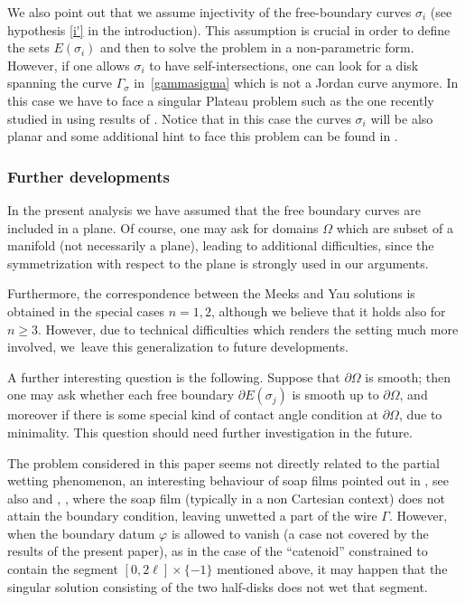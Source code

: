 \documentclass[11pt]{article}
\numberwithin{equation}{section}
\let\Om\Omega
\theoremstyle{definition}
\begin{document}
We also point out that we assume injectivity of the free-boundary
curves $\sigma_i$ (see hypothesis \ref{i'} in the introduction).
This assumption is crucial in order to define the sets
$E(\sigma_i)$ and then to solve the problem in a non-parametric form.
However, if one allows $\sigma_i$ to have self-intersections,
one can look for a disk spanning the curve $\Gamma_\sigma$
in~\eqref{gammasigma} which is not a Jordan curve anymore.
In this case we have to face a singular Plateau problem such as the one
recently studied in \cite{Creutz}
using results of \cite{LW}. Notice that in this case the curves $\sigma_i$ will be also planar and some additional hint to face this problem can be found in \cite{CS}.

\subsubsection*{Further developments} In the present analysis we have assumed that the free boundary curves are included in a plane. Of course, one may ask for domains $\Omega$ which are subset of a manifold (not necessarily a plane), leading to additional difficulties,
since the symmetrization with respect to the plane is strongly used in our arguments.

Furthermore, the correspondence between the Meeks and Yau
solutions is obtained in the special cases $n=1,2$,
although we believe that it holds also for $n\geq3$. However, due to technical difficulties which renders the setting much more involved, we~leave this generalization to future developments.

A further interesting question
is the following. Suppose that
$\partial \Om$ is smooth; then one may ask whether each free
boundary $\partial E(\sigma_j)$
is smooth up to $\partial \Om$, and moreover if there is some special
kind of contact angle condition at $\partial \Om$, due to minimality.
This question should need further investigation in the future.

The problem
considered in this paper seems not directly related to the
partial wetting phenomenon, an interesting behaviour of
soap films pointed out in \cite{Almgren}, see also
\cite{Brakke} and
\cite{2017_Bellettini_Paolini_Pasquarelli}, \cite{BPPS},
where the soap film
(typically in a non Cartesian context) does not
attain the boundary condition, leaving unwetted a part of the
wire $\Gamma$.
However, when the boundary datum $\varphi$ is allowed
to vanish (a case not covered by the results of the present paper),
as in the case of the ``catenoid'' constrained to contain the segment $[0,2\ell] \times \{-1\}$
mentioned above,
it may happen that the
singular solution consisting of
the two half-disks does not wet that segment.
\end{document}
